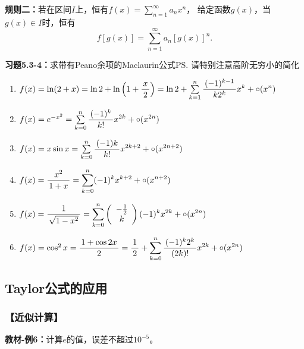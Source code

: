 {\bf 规则二：}若在区间$I$上，恒有$f(x)=\sum\limits_{n=1}^{\infty}a_nx^n$，
给定函数$g(x)$，当$g(x)\in I$时，恒有
$$f[g(x)]=\sum\limits_{n=1}^{\infty}a_n[g(x)]^n.$$

{\b{\bf 习题5.3-4：}求带有Peano余项的Maclaurin公式\ps{请特别注意高阶无穷小的简化}
\begin{enumerate}[(1)]
  \setlength{\itemindent}{1cm}
  \item $f(x)=\ln(2+x)=\ln2+\ln\left(1+\displaystyle\frac{\,{x}\,}{\,{2}\,}\right)
  =\ln2+\sum\limits_{k=1}^n\displaystyle\frac{\,{(-1)^{k-1}}\,}{\,{k2^k}\,}x^k+\circ(x^n)$ 
  \item $f(x)=e^{-x^2}=\sum\limits_{k=0}^n\displaystyle\frac{\,{(-1)^k}\,}{\,{k!}\,}x^{2k}
  +\circ(x^{2n})$
  \item $f(x)=x\sin x=\sum\limits_{k=0}^{n}\displaystyle\frac{\,{(-1)k}\,}{\,{k!}\,}x^{2k+2}
  +\circ(x^{2n+2})$ 
  \item $f(x)=\displaystyle\frac{\,{x^2}\,}{\,{1+x}\,}=\sum\limits_{k=0}^n(-1)^kx^{k+2}
  +\circ(x^{n+2})$ 
  \item $f(x)=\displaystyle\frac{\,{1}\,}{\,{\sqrt{1-x^2}}\,}=\sum\limits_{k=0}^n\left(
  \begin{array}{c}
  -\frac12\\ k
  \end{array}\right)(-1)^kx^{2k}+\circ(x^{2n})$ 
  \item $f(x)=\cos^2x=\displaystyle\frac{\,{1+\cos2x}\,}{\,{2}\,}=\displaystyle\frac{\,{1}\,}{\,{2}\,}+
  \sum\limits_{k=0}^{n}\displaystyle\frac{\,{(-1)^k2^k}\,}{\,{(2k)!}\,}x^{2k}+\circ(x^{2n})$
\end{enumerate}}

\subsection{Taylor公式的应用}

\subsubsection{【近似计算】}

{\bf 教材-例6：}计算$e$的值，误差不超过$10^{-5}$。

